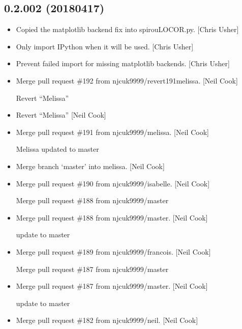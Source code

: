 \documentclass[a4paper,10pt,english]{report}
\begin{document}
\subsection{0.2.002 (2018\sphinxhyphen{}04\sphinxhyphen{}17)}
\label{\detokenize{misc/changelog:id480}}\begin{itemize}
\item {} 
Copied the matplotlib backend fix into spirouLOCOR.py. {[}Chris Usher{]}

\item {} 
Only import IPython when it will be used. {[}Chris Usher{]}

\item {} 
Prevent failed import for missing matplotlib backends. {[}Chris Usher{]}

\item {} 
Merge pull request \#192 from njcuk9999/revert\sphinxhyphen{}191\sphinxhyphen{}melissa. {[}Neil Cook{]}

Revert “Melissa”

\item {} 
Revert “Melissa” {[}Neil Cook{]}

\item {} 
Merge pull request \#191 from njcuk9999/melissa. {[}Neil Cook{]}

Melissa \sphinxhyphen{} updated to master

\item {} 
Merge branch ‘master’ into melissa. {[}Neil Cook{]}

\item {} 
Merge pull request \#190 from njcuk9999/isabelle. {[}Neil Cook{]}

Merge pull request \#188 from njcuk9999/master

\item {} 
Merge pull request \#188 from njcuk9999/master. {[}Neil Cook{]}

update to master

\item {} 
Merge pull request \#189 from njcuk9999/francois. {[}Neil Cook{]}

Merge pull request \#187 from njcuk9999/master

\item {} 
Merge pull request \#187 from njcuk9999/master. {[}Neil Cook{]}

update to master

\item {} 
Merge pull request \#182 from njcuk9999/neil. {[}Neil Cook{]}


\end{itemize}
\end{document}
